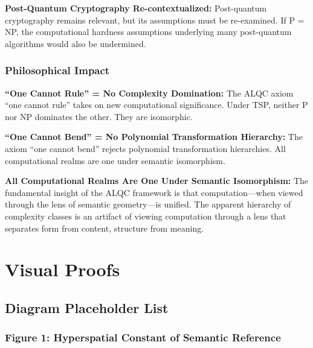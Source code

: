 \documentclass[11pt, letterpaper]{article}
\begin{document}
\textbf{Post-Quantum Cryptography Re-contextualized:}
Post-quantum cryptography remains relevant, but its assumptions must be re-examined. If P = NP, the computational hardness assumptions underlying many post-quantum algorithms would also be undermined.

\subsubsection{Philosophical Impact}

\textbf{``One Cannot Rule'' = No Complexity Domination:}
The ALQC axiom ``one cannot rule'' takes on new computational significance. Under TSP, neither P nor NP dominates the other. They are isomorphic.

\textbf{``One Cannot Bend'' = No Polynomial Transformation Hierarchy:}
The axiom ``one cannot bend'' rejects polynomial transformation hierarchies. All computational realms are one under semantic isomorphism.

\textbf{All Computational Realms Are One Under Semantic Isomorphism:}
The fundamental insight of the ALQC framework is that computation—when viewed through the lens of semantic geometry—is unified. The apparent hierarchy of complexity classes is an artifact of viewing computation through a lens that separates form from content, structure from meaning.

\newpage

\section{Visual Proofs}

\subsection{Diagram Placeholder List}

\subsubsection{Figure 1: Hyperspatial Constant of Semantic Reference}
\end{document}
